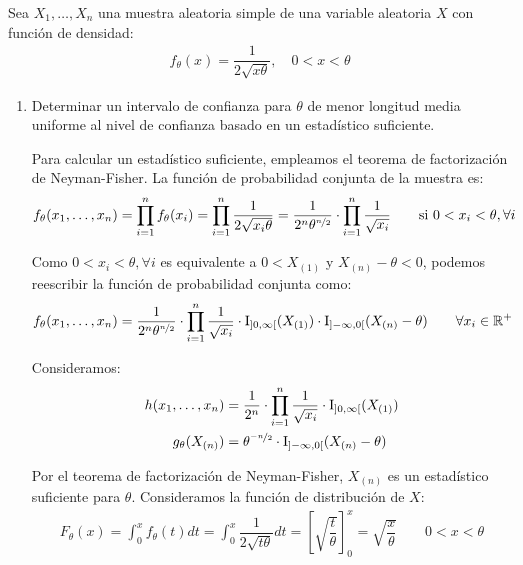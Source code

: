 \begin{ejercicio}[de Examen]
    Sea $X_1, \ldots, X_n$ una muestra aleatoria simple de una variable aleatoria $X$ con función de densidad:
    \begin{align*}
        f_\theta(x) = \dfrac{1}{2\sqrt{x\theta}}, \quad 0 < x < \theta
    \end{align*}
    \begin{enumerate}
        \item Determinar un intervalo de confianza para $\theta$ de menor longitud media uniforme al nivel de confianza basado en un estadístico suficiente.
        
        Para calcular un estadístico suficiente, empleamos el teorema de factorización de Neyman-Fisher. La función de probabilidad conjunta de la muestra es:
        \begin{align*}
            f_\theta(x_1, \ldots, x_n) = \prod_{i=1}^{n} f_\theta(x_i) = \prod_{i=1}^{n} \dfrac{1}{2\sqrt{x_i\theta}} = \dfrac{1}{2^n \theta^{\nicefrac{n}{2}}}\cdot \prod_{i=1}^{n} \dfrac{1}{\sqrt{x_i}}\qquad \text{si } 0 < x_i < \theta, \forall i
        \end{align*}

        Como $0< x_i < \theta, \forall i$ es equivalente a $0<X_{(1)}$ y $X_{(n)}-\theta< 0$, podemos reescribir la función de probabilidad conjunta como:
        \begin{align*}
            f_\theta(x_1, \ldots, x_n) = \dfrac{1}{2^n \theta^{\nicefrac{n}{2}}}\cdot \prod_{i=1}^{n} \dfrac{1}{\sqrt{x_i}}\cdot \operatorname{I}_{\left]0, \infty\right[}(X_{(1)})\cdot \operatorname{I}_{\left]-\infty, 0\right[}(X_{(n)} - \theta)\qquad \forall x_i\in \mathbb{R}^+
        \end{align*}

        Consideramos:
        \begin{align*}
            h(x_1, \ldots, x_n) &= \dfrac{1}{2^n}\cdot \prod_{i=1}^{n} \dfrac{1}{\sqrt{x_i}}\cdot \operatorname{I}_{\left]0, \infty\right[}(X_{(1)})\\
            g_\theta(X_{(n)}) &= \theta^{\nicefrac{-n}{2}}\cdot \operatorname{I}_{\left]-\infty, 0\right[}(X_{(n)} - \theta)
        \end{align*}

        Por el teorema de factorización de Neyman-Fisher, $X_{(n)}$ es un estadístico suficiente para $\theta$. Consideramos la función de distribución de $X$:
        \begin{align*}
            F_\theta(x) = \int_{0}^{x} f_\theta(t) dt = \int_{0}^{x} \dfrac{1}{2\sqrt{t\theta}} dt = \left[\sqrt{\dfrac{t}{\theta}}\right]_{0}^{x} = \sqrt{\dfrac{x}{\theta}}\qquad 0 < x < \theta
        \end{align*}


\end{enumerate}
\end{ejercicio}
